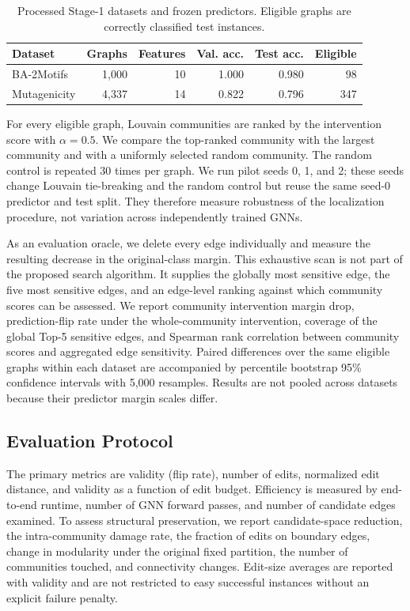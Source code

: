 \documentclass[runningheads]{llncs}
\begin{document}
\begin{table}[t]
\centering
\caption{Processed Stage-1 datasets and frozen predictors. Eligible graphs are
correctly classified test instances.}
\label{tab:stage1-data}
\small
\begin{tabular}{lrrrrr}
\toprule
Dataset & Graphs & Features & Val. acc. & Test acc. & Eligible \\
\midrule
BA-2Motifs & 1,000 & 10 & 1.000 & 0.980 & 98 \\
Mutagenicity & 4,337 & 14 & 0.822 & 0.796 & 347 \\
\bottomrule
\end{tabular}
\end{table}

For every eligible graph, Louvain communities are ranked by the intervention
score with $\alpha=0.5$. We compare the top-ranked community with the largest
community and with a uniformly selected random community. The random control
is repeated 30 times per graph. We run pilot seeds 0, 1, and 2; these seeds
change Louvain tie-breaking and the random control but reuse the same seed-0
predictor and test split. They therefore measure robustness of the
localization procedure, not variation across independently trained GNNs.

As an evaluation oracle, we delete every edge individually and measure the
resulting decrease in the original-class margin. This exhaustive scan is not
part of the proposed search algorithm. It supplies the globally most
sensitive edge, the five most sensitive edges, and an edge-level ranking
against which community scores can be assessed. We report community
intervention margin drop, prediction-flip rate under the whole-community
intervention, coverage of the global Top-5 sensitive edges, and Spearman rank
correlation between community scores and aggregated edge sensitivity. Paired
differences over the same eligible graphs within each dataset are accompanied
by percentile bootstrap 95\% confidence intervals with 5,000 resamples.
Results are not pooled across datasets because their predictor margin scales
differ.

\subsection{Evaluation Protocol}
The primary metrics are validity (flip rate), number of edits, normalized edit
distance, and validity as a function of edit budget. Efficiency is measured by
end-to-end runtime, number of GNN forward passes, and number of candidate edges
examined. To assess structural preservation, we report candidate-space
reduction, the intra-community damage rate, the fraction of edits on boundary
edges, change in modularity under the original fixed partition, the number of
communities touched, and connectivity changes. Edit-size averages are reported
with validity and are not restricted to easy successful instances without an
explicit failure penalty.
\end{document}
